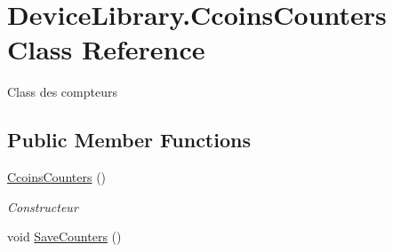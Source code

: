 \hypertarget{class_device_library_1_1_ccoins_counters}{}\section{Device\+Library.\+Ccoins\+Counters Class Reference}
\label{class_device_library_1_1_ccoins_counters}


Class des compteurs  


\subsection*{Public Member Functions}
\begin{DoxyCompactItemize}
\item 
\mbox{\hyperlink{class_device_library_1_1_ccoins_counters_a21642915e14253235bcd1f48e065d658}{Ccoins\+Counters}} ()
\begin{DoxyCompactList}\small\item\em Constructeur \end{DoxyCompactList}\item 
void \mbox{\hyperlink{class_device_library_1_1_ccoins_counters_a0325b954f24433b990840bae5a484e6d}{Save\+Counters}} ()
\end{DoxyCompactItemize}
